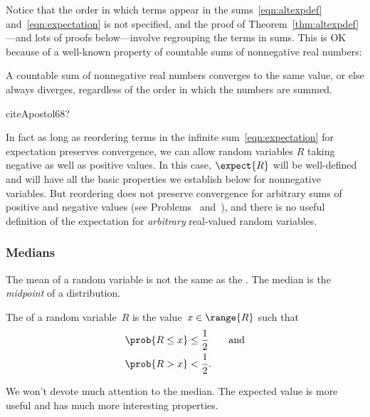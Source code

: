 Notice that the order in which terms appear in the
sums~\eqref{eqn:altexpdef} and~\eqref{eqn:expectation} is not
specified, and the proof of Theorem~\ref{thm:altexpdef}---and lots of
proofs below---involve regrouping the terms in sums.  This is OK
because of a well-known property of countable sums of nonnegative real
numbers:
\begin{theorem}
A countable sum of nonnegative real numbers converges to the same
value, or else always diverges, regardless of the order in which the
numbers are summed.
\end{theorem}
\begin{editingnotes}
 cite{Apostol68}?
\end{editingnotes}
In fact as long as reordering terms in the infinite
sum~\eqref{eqn:expectation} for expectation preserves convergence, we
can allow random variables $R$ taking negative as well as positive
values.  In this case, $\expect{R}$ will be well-defined and will have
all the basic properties we establish below for nonnegative variables.
But reordering does not preserve convergence for arbitrary sums of
positive and negative values (see
Problems~
and~), and there is no useful
definition of the expectation for \emph{arbitrary} real-valued random
variables.

\begin{editingnotes}
\subsubsection{Medians}
The mean of a random variable is not the same as the .
The median is the \emph{midpoint} of a distribution.
 
\begin{definition}%
The  of a random variable~$R$ is the value~$x \in
\range{R}$ such that
\begin{align*}
    \prob{R \le x} & \le \frac{1}{2} \qquad \text{and} \\
    \prob{R > x}   & <    \frac{1}{2}.
\end{align*}
\end{definition}

We won't devote much attention to the median.  The expected value is
more useful and has much more interesting properties.
\end{editingnotes}

\iffalse
\footnote{Some texts define the median to be the
  value of $x \in \range{R}$ for which $\prob{R \le x} < 1/2$ and
  $\prob{R > x} \le 1/2$.  The difference in definitions is
  not important.}
\fi

